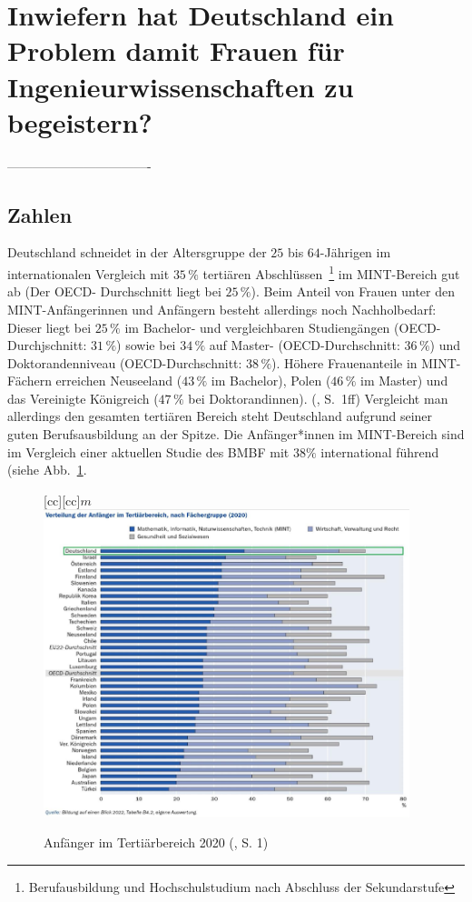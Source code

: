 \documentclass[a4paper, 12 pt]{IEEEtran}
\begin{document}

\section{Inwiefern hat Deutschland ein Problem damit Frauen für Ingenieurwissenschaften zu begeistern?}
\label{sec:SpeziellesProblemInD}
----------------------------------

\subsection{Zahlen}
Deutschland schneidet in der Altersgruppe der $25$ bis $64$-Jährigen im internationalen Vergleich mit $35\,\%$ tertiären Abschlüssen~\footnote{Berufausbildung und Hochschulstudium nach Abschluss der Sekundarstufe} im MINT-Bereich gut ab (Der OECD- Durchschnitt liegt bei $25\,\%$). 
Beim Anteil von Frauen unter den MINT-Anfängerinnen und Anfängern besteht allerdings noch Nachholbedarf: Dieser liegt bei $25\,\%$ im Bachelor- und vergleichbaren Studiengängen (OECD- Durchjschnitt: $31\,\%$) sowie bei $34\,\%$ auf Master- (OECD-Durchschnitt: $36\,\%$) und Doktorandenniveau (OECD-Durchschnitt: $38\,\%$). Höhere Frauenanteile in MINT-Fächern erreichen Neuseeland ($43\,\%$ im Bachelor), Polen ($46\,\%$ im Master) und das Vereinigte Königreich ($47\,\%$ bei Doktorandinnen). (\cite{BMBF.2022}, S.~1ff)
Vergleicht man allerdings den gesamten tertiären Bereich steht Deutschland aufgrund seiner guten Berufsausbildung an der Spitze. Die Anfänger*innen im MINT-Bereich sind im Vergleich einer aktuellen Studie des BMBF mit $38\%$ international führend (siehe Abb.~\ref{fig:terziaer}. 

\begin{figure}[!ht]
	\centering
{}[cc][cc]{$m$}
	\includegraphics[width=0.95\textwidth]{terziaer}
	\caption{Anfänger im Tertiärbereich 2020 (\cite{BMBF.2022}, S. 1)}
	\label{fig:terziaer}
\end{figure}
\end{document}
